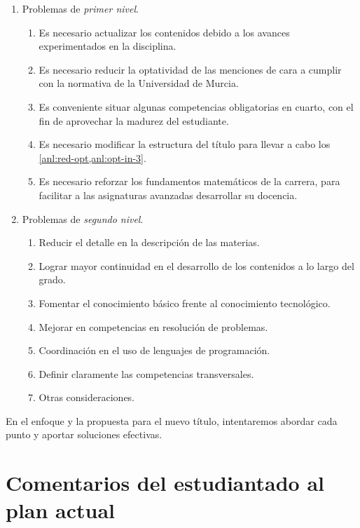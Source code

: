 \begin{enumerate}
    \item Problemas de \emph{primer nivel}.
    \begin{enumerate}
        \item Es necesario actualizar los contenidos
        debido a los avances experimentados en la disciplina.
        \item\label{anl:red-opt}
        Es necesario reducir la optatividad de las menciones de cara a
        cumplir con la normativa de la Universidad de Murcia.
        \item\label{anl:opt-in-3}
        Es conveniente situar algunas competencias obligatorias en cuarto,
        con el fin de aprovechar la madurez del estudiante.
        \item \label{anl:mod-structure} Es necesario
        modificar la estructura del título para llevar a cabo los
        \cref{anl:red-opt,anl:opt-in-3}.
        \item Es necesario reforzar los fundamentos matemáticos de la carrera,
        para facilitar a las asignaturas avanzadas desarrollar su docencia.
    \end{enumerate}

    \item Problemas de \emph{segundo nivel}.
    \begin{enumerate}
        \item Reducir el detalle en la descripción de las materias.
        \item Lograr mayor continuidad en el desarrollo de los contenidos
        a lo largo del grado.
        \item Fomentar el conocimiento básico
        frente al conocimiento tecnológico.
        \item \label{anl:problem-solving} Mejorar en
        competencias en resolución de problemas.
        \item Coordinación en el uso de lenguajes de programación.
        \item Definir claramente las competencias transversales.
        \item Otras consideraciones.
    \end{enumerate}
\end{enumerate}

En el enfoque y la propuesta para el nuevo título,
intentaremos abordar cada punto y aportar soluciones efectivas.

\section{Comentarios del estudiantado al plan actual}

